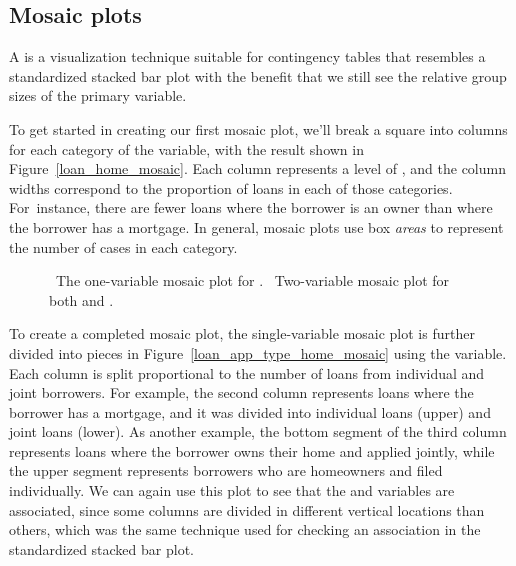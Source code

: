 
\subsection{Mosaic plots}
\label{mosaic_plots_subsection}

A  is a visualization technique
suitable for contingency tables that resembles
a standardized stacked bar plot with the benefit
that we still see the relative group sizes of the
primary variable.

To get started in creating our first mosaic plot,
we'll break a square into columns for each category
of the  variable,
with the result shown in Figure~\ref{loan_home_mosaic}.
Each column represents a level of ,
and the column widths correspond to the proportion of
loans in each of those categories.
For~instance, there are fewer loans where the borrower
is an owner than where the borrower has a mortgage.
In general, mosaic plots use box \emph{areas}
to represent the number of cases in each category.

\begin{figure}[h]
  \centering
  \caption{~The one-variable mosaic
      plot for .
      ~Two-variable mosaic
      plot for both 
      and .}
  \label{loan_app_type_home_mosaic_plot}
\end{figure}

To create a completed mosaic plot, the single-variable
mosaic plot is further divided into pieces in
Figure~\ref{loan_app_type_home_mosaic} using the
 variable.
Each column is split proportional to the
number of loans from individual and joint
borrowers.
For example, the second column represents loans
where the borrower has a mortgage,
and it was divided into individual loans (upper)
and joint loans (lower).
As another example, the bottom segment of the third column
represents loans where the borrower owns their home
and applied jointly, while the upper segment represents
borrowers who are homeowners and filed individually.
We can again use this plot to see that
the  and 
variables are associated, since some columns are divided
in different vertical locations than others,
which was the same technique used for checking an
association in the standardized stacked bar plot.

